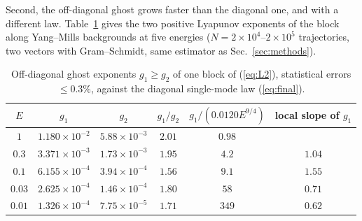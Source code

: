 \documentclass[11pt,a4paper]{article}
\begin{document}
Second, the off-diagonal ghost grows faster than the diagonal one, and with a different law.
Table~\ref{tab:offdiag} gives the two positive Lyapunov exponents of the block along
Yang--Mills backgrounds at five energies ($N=2\times10^4$--$2\times10^5$ trajectories, two
vectors with Gram--Schmidt, same estimator as Sec.~\ref{sec:methods}).

\begin{table}
\centering
\caption{Off-diagonal ghost exponents $g_1\ge g_2$ of one block of (\ref{eq:L2}), statistical
errors $\le0.3\%$, against the diagonal single-mode law (\ref{eq:final}).}
\label{tab:offdiag}
\begin{tabular}{cccccc}
\toprule
$E$ & $g_1$ & $g_2$ & $g_1/g_2$ & $g_1/(0.0120E^{9/4})$ & local slope of $g_1$\\
\midrule
$1$    & $1.180\times10^{-2}$ & $5.88\times10^{-3}$ & $2.01$ & $0.98$ & \\
$0.3$  & $3.371\times10^{-3}$ & $1.73\times10^{-3}$ & $1.95$ & $4.2$ & $1.04$\\
$0.1$  & $6.155\times10^{-4}$ & $3.94\times10^{-4}$ & $1.56$ & $9.1$ & $1.55$\\
$0.03$ & $2.625\times10^{-4}$ & $1.46\times10^{-4}$ & $1.80$ & $58$ & $0.71$\\
$0.01$ & $1.326\times10^{-4}$ & $7.75\times10^{-5}$ & $1.71$ & $349$ & $0.62$\\
\bottomrule
\end{tabular}
\end{table}
\end{document}
